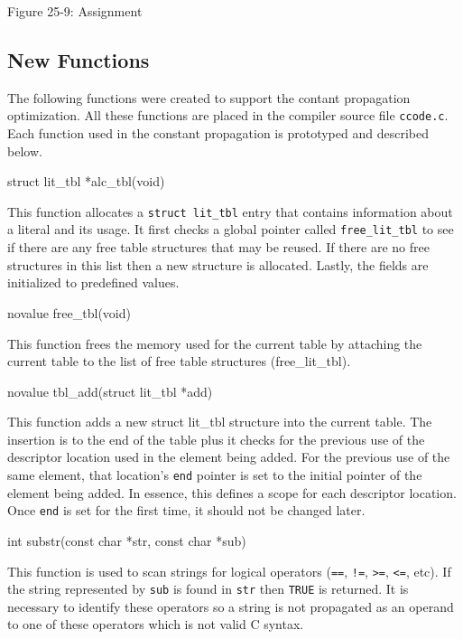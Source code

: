 \bigskip

{\centering{}
Figure 25-9: Assignment
\par}

\subsection{New Functions}

The following functions were created to support the contant
propagation optimization. All these functions are placed in the
compiler source file \texttt{ccode.c}. Each function used in the
constant propagation is prototyped and described below.

{\ttfamily\mdseries
struct lit\_tbl *alc\_tbl(void)}


This function allocates a \texttt{struct lit\_tbl} entry that contains
information about a literal and its usage. It first checks a global
pointer called \texttt{free\_lit\_tbl} to see if there are any free
table structures that may be reused. If there are no free structures
in this list then a new structure is allocated. Lastly, the fields are
initialized to predefined values.

{\ttfamily\mdseries
novalue free\_tbl(void)}


This function frees the memory used for the current table by attaching
the current table to the list of free table structures
(free\_lit\_tbl).

{\ttfamily\mdseries
novalue tbl\_add(struct lit\_tbl *add)}


This function adds a new struct lit\_tbl structure into the current
table. The insertion is to the end of the table plus it checks for the
previous use of the descriptor location used in the element being
added. For the previous use of the same element, that location's
\texttt{end} pointer is set to the initial pointer of the element
being added. In essence, this defines a scope for each descriptor
location. Once \texttt{end} is set for the first time, it should not
be changed later.

{\ttfamily\mdseries
int substr(const char *str, const char *sub)}


This function is used to scan strings for logical operators
(\texttt{==}, \texttt{!=}, \texttt{{\textgreater}=},
\texttt{{\textless}=}, etc). If the string represented by \texttt{sub}
is found in \texttt{str} then \texttt{TRUE} is returned. It is
necessary to identify these operators so a string is not propagated as
an operand to one of these operators which is not valid C syntax.


